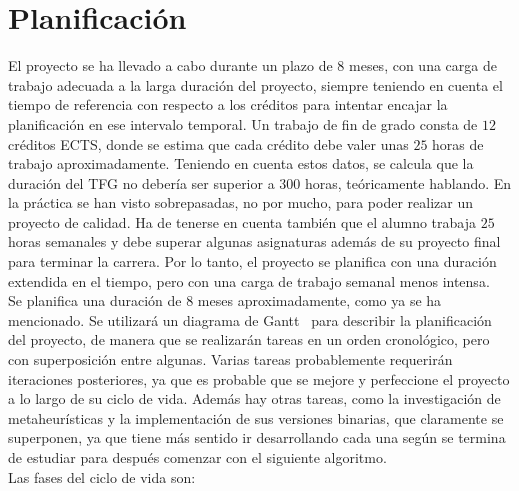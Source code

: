 \chapter{Planificación}
El proyecto se ha llevado a cabo durante un plazo de $8$ meses, con una carga de trabajo adecuada a la larga duración del proyecto, siempre teniendo en cuenta el tiempo de referencia con respecto a los créditos para intentar encajar la planificación en ese intervalo temporal.
Un trabajo de fin de grado consta de $12$ créditos ECTS, donde se estima que cada crédito debe valer unas $25$ horas de trabajo aproximadamente. Teniendo en cuenta estos datos, se calcula que la duración del TFG no debería ser superior a $300$ horas, teóricamente hablando. En la práctica se han visto sobrepasadas, no por mucho, para poder realizar un proyecto de calidad. Ha de tenerse en cuenta también que el alumno trabaja $25$ horas semanales y debe superar algunas asignaturas además de su proyecto final para terminar la carrera. Por lo tanto, el proyecto se planifica con una duración extendida en el tiempo, pero con una carga de trabajo semanal menos intensa.\\[6pt]
Se planifica una duración de $8$ meses aproximadamente, como ya se ha mencionado. Se utilizará un diagrama de Gantt~\cite{Clark1922} para describir la planificación del proyecto, de manera que se realizarán tareas en un orden cronológico, pero con superposición entre algunas. Varias tareas probablemente requerirán iteraciones posteriores, ya que es probable que se mejore y perfeccione el proyecto a lo largo de su ciclo de vida. Además hay otras tareas, como la investigación de metaheurísticas y la implementación de sus versiones binarias, que claramente se superponen, ya que tiene más sentido ir desarrollando cada una según se termina de estudiar para después comenzar con el siguiente algoritmo. \\[6pt]
Las fases del ciclo de vida son:

